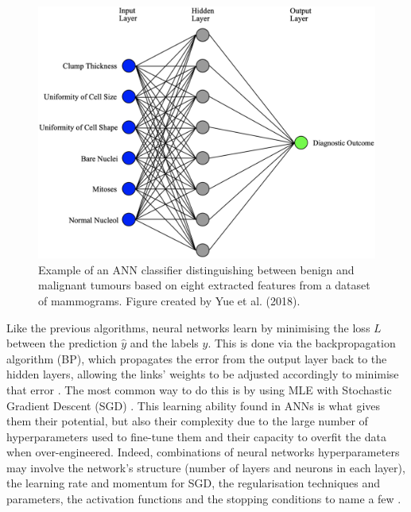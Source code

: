 \begin{figure}[ht]
\centerline{\includegraphics[width=\textwidth]{figures/litsurvey/ann.png}}
\caption{\label{fig:litsurvey-ann-example}Example of an ANN classifier distinguishing between benign and malignant tumours based on eight extracted features from a dataset of mammograms. Figure created by Yue et al. (2018).}
\end{figure}

Like the previous algorithms, neural networks learn by minimising the loss $L$ between the prediction $\hat{y}$ and the labels $y$. This is done via the backpropagation algorithm (BP), which propagates the error from the output layer back to the hidden layers, allowing the links' weights to be adjusted accordingly to minimise that error \citep{russell2002artificial}. The most common way to do this is by using MLE with Stochastic Gradient Descent (SGD) \citep{Litjens2017}. This learning ability found in ANNs is what gives them their potential, but also their complexity due to the large number of hyperparameters used to fine-tune them and their capacity to overfit the data when over-engineered. Indeed, combinations of neural networks hyperparameters may involve the network's structure (number of layers and neurons in each layer), the learning rate and momentum for SGD, the regularisation techniques and parameters, the activation functions and the stopping conditions to name a few \citep{sklearn-MLP-2019}.\\
 
